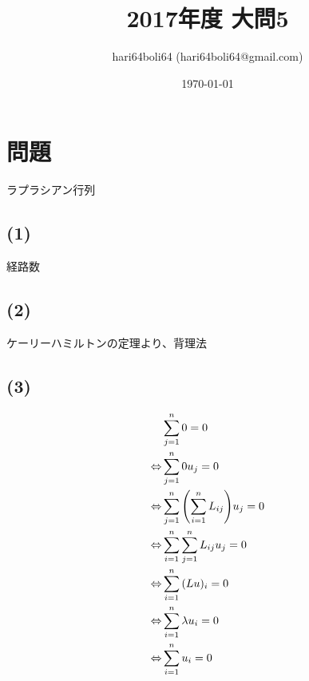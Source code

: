 \documentclass[a4paper, 10pt, dvipdfmx]{jlreq}
\begin{document}
\title{2017年度 大問5}
\author{hari64boli64 (hari64boli64@gmail.com)}
\date{\today}
\maketitle

\section{問題}

ラプラシアン行列

\subsection*{(1)}
経路数

\subsection*{(2)}
ケーリーハミルトンの定理より、背理法

\subsection*{(3)}
\begin{align*}
                  & \sum_{j=1}^{n}{0}=0                             \\
  \Leftrightarrow & \sum_{j=1}^{n}{0u_j}=0                          \\
  \Leftrightarrow & \sum_{j=1}^{n}\qty(\sum_{i=1}^{n}{L_{ij}})u_j=0 \\
  \Leftrightarrow & \sum_{i=1}^{n}\sum_{j=1}^{n}{L_{ij}u_j}=0       \\
  \Leftrightarrow & \sum_{i=1}^{n}{(Lu)_i}=0                        \\
  \Leftrightarrow & \sum_{i=1}^{n}{\lambda u_i}=0                   \\
  \Leftrightarrow & \sum_{i=1}^{n}{u_i}=0                           \\
\end{align*}
\end{document}
